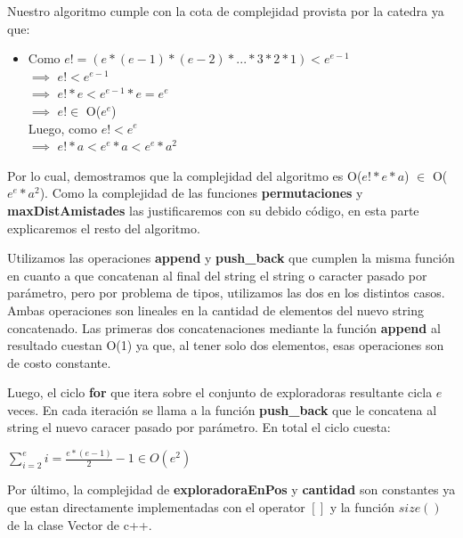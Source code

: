 \documentclass[11pt]{article}
\begin{document}
Nuestro algoritmo cumple con la cota de complejidad provista por la catedra ya que:
\begin{itemize}
  \item Como $e! = (e*(e-1)*(e-2)*...*3*2*1) < e^{e-1}$ \\ $\implies$ $e! < e^{e-1}$ \\ $\implies$ $e!*e < e^{e-1}*e 
    = e^{e}$ \\ $\implies$ $e! \in$ O($e^e$) \\
    Luego, como $e! < e^e$ \\ $\implies$ $e!*a < e^e*a < e^e*a^2$
\end{itemize}
Por lo cual, demostramos que la complejidad del algoritmo es O($e!*e*a$) $\in$ O($e^e*a^2$).
Como la complejidad de las funciones \textbf{permutaciones} 
y \textbf{maxDistAmistades} las justificaremos con su debido código, en esta parte explicaremos el resto del 
algoritmo. 

Utilizamos las operaciones \textbf{append} y \textbf{push\_back} que cumplen la misma función en cuanto a que
concatenan al final del string el string o caracter pasado por parámetro, pero por problema de tipos, 
utilizamos las dos en los distintos casos. Ambas operaciones son lineales en la cantidad de elementos del nuevo string concatenado.
Las primeras dos concatenaciones mediante la función \textbf{append} al resultado cuestan O(1) ya que, al 
tener solo dos elementos, esas operaciones son de costo constante.

Luego, el ciclo \textbf{for} que itera sobre el conjunto de exploradoras resultante cicla $e$ veces. En cada
iteración se llama a la función \textbf{push\_back} que le concatena al string el nuevo caracer pasado por parámetro.
En total el ciclo cuesta:

\begin{center}
$\sum\limits_{i=2}^e i = \frac{e*(e-1)}{2} - 1 \in O(e^2)$
\end{center}

Por último, la complejidad de \textbf{exploradoraEnPos} y \textbf{cantidad} son constantes ya que estan
directamente implementadas con el operator $[]$ y la función $size()$ de la clase Vector de c++.
\end{document}
